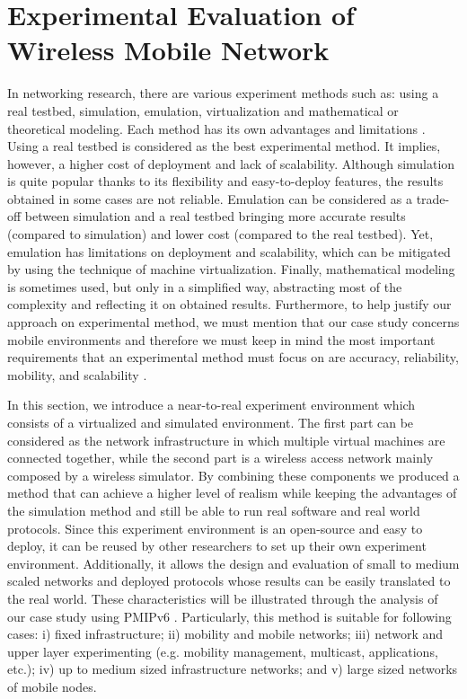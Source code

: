 \section{Experimental Evaluation of Wireless Mobile Network}
In networking research, there are various experiment methods such as: using a real testbed, simulation, emulation, virtualization and mathematical or theoretical modeling. Each method has its own advantages and limitations \cite{art_of_analysis}. Using a real testbed is considered as the best experimental method. It implies, however, a higher cost of deployment and lack of scalability. Although simulation is quite popular thanks to its flexibility and easy-to-deploy features, the results obtained in some cases are not reliable. Emulation can be considered as a trade-off between simulation and a real testbed bringing more accurate results (compared to simulation) and lower cost (compared to the real testbed). Yet, emulation has limitations on deployment and scalability, which can be mitigated by using the technique of machine virtualization.  Finally, mathematical modeling is sometimes used, but only in a simplified way, abstracting most of the complexity and reflecting it on obtained results. Furthermore, to help justify our approach on experimental method, we must mention that our case study concerns mobile environments and therefore we must keep in mind the most important requirements that an experimental method must focus on are accuracy, reliability, mobility, and scalability \cite{ASSERT}. 

In this section, we introduce a near-to-real experiment environment which consists of a virtualized and simulated environment. The first part can be considered as the network infrastructure in which multiple virtual machines are connected together, while the second part is a wireless access network mainly composed by a wireless simulator. By combining these components we produced a method that can achieve a higher level of realism while keeping the advantages of the simulation method and still be able to run real software and real world protocols. Since this experiment environment is an open-source and easy to deploy, it can be reused by other researchers to set up their own experiment environment. Additionally, it allows the design and evaluation of small to medium scaled networks and deployed protocols whose results can be easily translated to the real world. These characteristics will be illustrated through the analysis of our case study using PMIPv6 \cite{PMIPv6}. Particularly, this method is suitable for following cases: i) fixed infrastructure; ii) mobility and mobile networks; iii) network and upper layer experimenting (e.g. mobility management, multicast, applications, etc.); iv) up to medium sized infrastructure networks; and v) large sized networks of mobile nodes.


